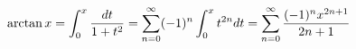 \documentclass[preview]{standalone}
\begin{document}
\begin{align*}
\special{dvisvgm:raw <g id='unique000'>}\arctan x=\displaystyle\int_0^x\dfrac{dt}{1+t^2}=\sum_{n=0}^{\infty}(-1)^n\int_0^xt^{2n}dt=\sum_{n=0}^{\infty}\dfrac{(-1)^nx^{2n+1}}{2n+1}\special{dvisvgm:raw </g>}
\end{align*}
\end{document}
